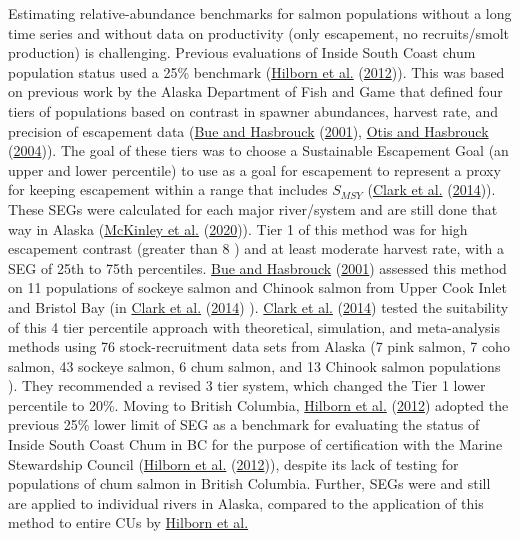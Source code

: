 \documentclass[11pt]{book}
\begin{document}
Estimating relative-abundance benchmarks for salmon populations without a long time series and without data on productivity (only escapement, no recruits/smolt production) is challenging. Previous evaluations of Inside South Coast chum population status used a 25\% benchmark (\protect\hyperlink{ref-hilbornBritishColumbiaChum2012}{Hilborn et al.} (\protect\hyperlink{ref-hilbornBritishColumbiaChum2012}{2012})). This was based on previous work by the Alaska Department of Fish and Game that defined four tiers of populations based on contrast in spawner abundances, harvest rate, and precision of escapement data (\protect\hyperlink{ref-bueEscapementGoalReview2001}{Bue and Hasbrouck} (\protect\hyperlink{ref-bueEscapementGoalReview2001}{2001}), \protect\hyperlink{ref-otisEscapementGoalsSalmon2004}{Otis and Hasbrouck} (\protect\hyperlink{ref-otisEscapementGoalsSalmon2004}{2004})). The goal of these tiers was to choose a Sustainable Escapement Goal (an upper and lower percentile) to use as a goal for escapement to represent a proxy for keeping escapement within a range that includes \(S_{MSY}\) (\protect\hyperlink{ref-clarkEvaluationPercentileApproach2014}{Clark et al.} (\protect\hyperlink{ref-clarkEvaluationPercentileApproach2014}{2014})). These SEGs were calculated for each major river/system and are still done that way in Alaska (\protect\hyperlink{ref-mckinleyReviewSalmonEscapement2020}{McKinley et al.} (\protect\hyperlink{ref-mckinleyReviewSalmonEscapement2020}{2020})). Tier 1 of this method was for high escapement contrast (greater than 8 ) and at least moderate harvest rate, with a SEG of 25th to 75th percentiles. \protect\hyperlink{ref-bueEscapementGoalReview2001}{Bue and Hasbrouck} (\protect\hyperlink{ref-bueEscapementGoalReview2001}{2001}) assessed this method on 11 populations of sockeye salmon and Chinook salmon from Upper Cook Inlet and Bristol Bay (in \protect\hyperlink{ref-clarkEvaluationPercentileApproach2014}{Clark et al.} (\protect\hyperlink{ref-clarkEvaluationPercentileApproach2014}{2014}) ). \protect\hyperlink{ref-clarkEvaluationPercentileApproach2014}{Clark et al.} (\protect\hyperlink{ref-clarkEvaluationPercentileApproach2014}{2014}) tested the suitability of this 4 tier percentile approach with theoretical, simulation, and meta-analysis methods using 76 stock-recruitment data sets from Alaska (7 pink salmon, 7 coho salmon, 43 sockeye salmon, 6 chum salmon, and 13 Chinook salmon populations ). They recommended a revised 3 tier system, which changed the Tier 1 lower percentile to 20\%. Moving to British Columbia, \protect\hyperlink{ref-hilbornBritishColumbiaChum2012}{Hilborn et al.} (\protect\hyperlink{ref-hilbornBritishColumbiaChum2012}{2012}) adopted the previous 25\% lower limit of SEG as a benchmark for evaluating the status of Inside South Coast Chum in BC for the purpose of certification with the Marine Stewardship Council (\protect\hyperlink{ref-hilbornBritishColumbiaChum2012}{Hilborn et al.} (\protect\hyperlink{ref-hilbornBritishColumbiaChum2012}{2012})), despite its lack of testing for populations of chum salmon in British Columbia. Further, SEGs were and still are applied to individual rivers in Alaska, compared to the application of this method to entire CUs by \protect\hyperlink{ref-hilbornBritishColumbiaChum2012}{Hilborn et al.} 
\end{document}
